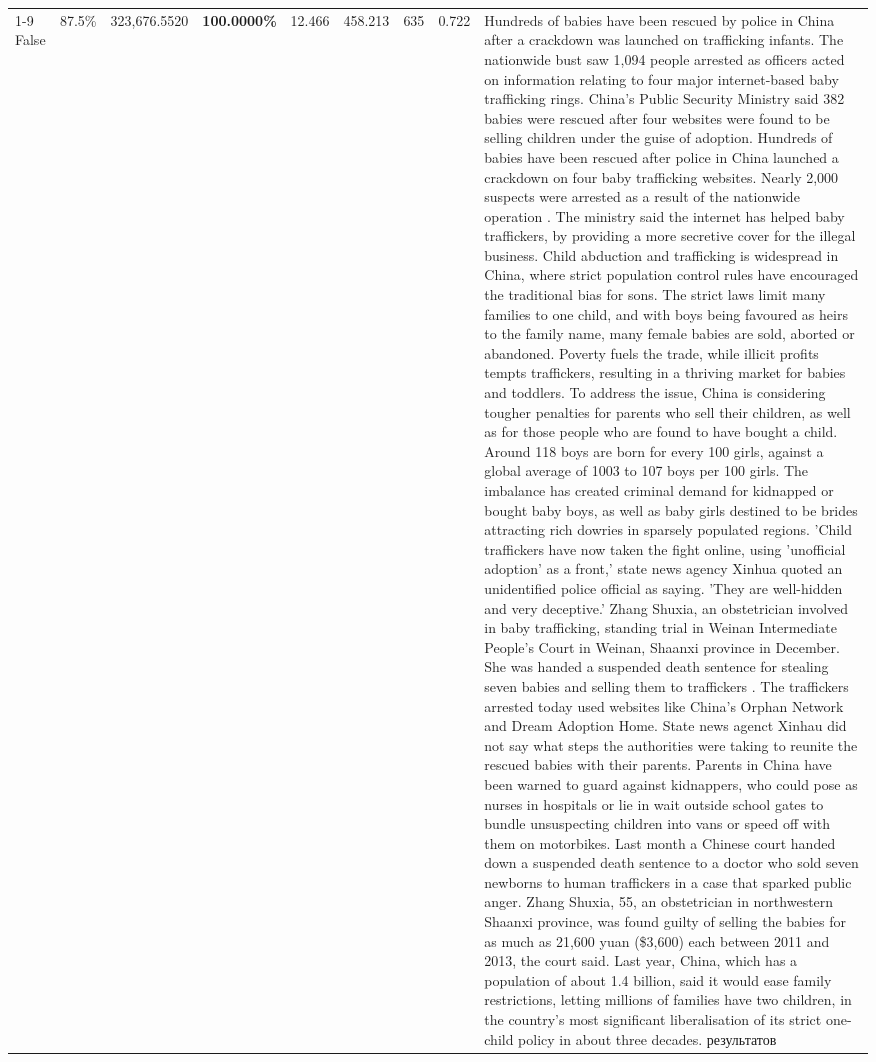 \begin{table}[H]
\begin{tabular}{lllrlllll}
\cline{1-9}
False & 87.5\% & 323,676.5520 & \bfseries \color{red} 100.0000\% & 12.466 & 458.213 & 635 & 0.722 & Hundreds of babies have been rescued by police in China after a crackdown was launched on trafficking infants. The nationwide bust saw 1,094 people arrested as officers acted on information relating to four major internet-based baby trafficking rings. China's Public Security Ministry said 382 babies were rescued after four websites were found to be selling children under the guise of adoption. Hundreds of babies have been rescued after police in China launched a crackdown on four baby trafficking websites. Nearly 2,000 suspects were arrested as a result of the nationwide operation . The ministry said the internet has helped baby traffickers, by providing a more secretive cover for the illegal business. Child abduction and trafficking is widespread in China, where strict population control rules have encouraged the traditional bias for sons. The strict laws limit many families to one child, and with boys being favoured as heirs to the family name, many female babies are sold, aborted or abandoned. Poverty fuels the trade, while illicit profits tempts traffickers, resulting in a thriving market for babies and toddlers. To address the issue, China is considering tougher penalties for parents who sell their children, as well as for those people who are found to have bought a child. Around 118 boys are born for every 100 girls, against a global average of 1003 to 107 boys per 100 girls. The imbalance has created criminal demand for kidnapped or bought baby boys, as well as baby girls destined to be brides attracting rich dowries in sparsely populated regions. 'Child traffickers have now taken the fight online, using 'unofficial adoption' as a front,' state news agency Xinhua quoted an unidentified police official as saying. 'They are well-hidden and very deceptive.' Zhang Shuxia, an obstetrician involved in baby trafficking, standing trial in Weinan Intermediate People's Court in Weinan, Shaanxi province in December. She was handed a suspended death sentence for stealing seven babies and selling them to traffickers . The traffickers arrested today used websites like China's Orphan Network and Dream Adoption Home. State news agenct Xinhau did not say what steps the authorities were taking to reunite the rescued babies with their parents. Parents in China have been warned to guard against kidnappers, who could pose as nurses in hospitals or lie in wait outside school gates to bundle unsuspecting children into vans or speed off with them on motorbikes. Last month a Chinese court handed down a suspended death sentence to a doctor who sold seven newborns to human traffickers in a case that sparked public anger. Zhang Shuxia, 55, an obstetrician in northwestern Shaanxi province, was found guilty of selling the babies for as much as 21,600 yuan (\$3,600) each between 2011 and 2013, the court said. Last year, China, which has a population of about 1.4 billion, said it would ease family restrictions, letting millions of families have two children, in the country's most significant liberalisation of its strict one-child policy in about three decades. результатов \\

\end{tabular}
\end{table}
